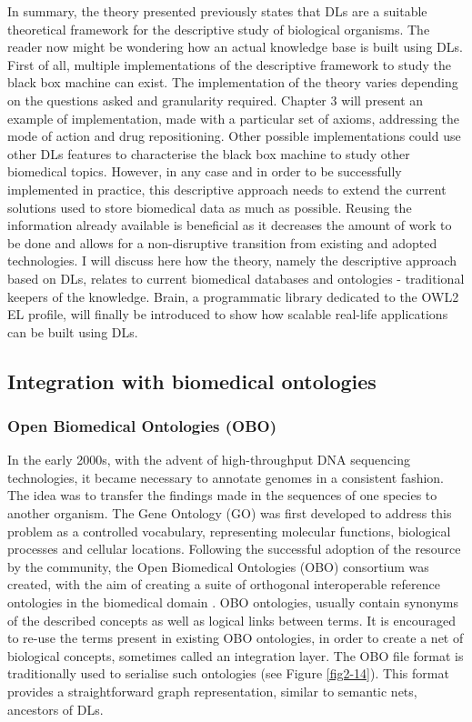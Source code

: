 In summary, the theory presented previously states that DLs are a suitable theoretical framework for the descriptive study of biological organisms. The reader now might be wondering how an actual knowledge base is built using DLs. First of all, multiple implementations of the descriptive framework to study the black box machine can exist. The implementation of the theory varies depending on the questions asked and granularity required. Chapter 3 will present an example of implementation, made with a particular set of axioms, addressing the mode of action and drug repositioning. Other possible implementations could use other DLs features to characterise the black box machine to study other biomedical topics. However, in any case and in order to be successfully implemented in practice, this descriptive approach needs to extend the current solutions used to store biomedical data as much as possible. Reusing the information already available is beneficial as it decreases the amount of work to be done and allows for a non-disruptive transition from existing and adopted technologies. I will discuss here how the theory, namely the descriptive approach based on DLs, relates to current biomedical databases and ontologies - traditional keepers of the knowledge. Brain, a programmatic library dedicated to the OWL2 EL profile, will finally be introduced to show how scalable real-life applications can be built using DLs.

\subsection{Integration with biomedical ontologies}

\subsubsection{Open Biomedical Ontologies (OBO)}

In the early 2000s, with the advent of high-throughput DNA sequencing technologies, it became necessary to annotate genomes in a consistent fashion. The idea was to transfer the findings made in the sequences of one species to another organism. The Gene Ontology (GO) was first developed to address this problem \citep{ashburner2000gene} as a controlled vocabulary, representing molecular functions, biological processes and cellular locations. Following the successful adoption of the resource by the community, the Open Biomedical Ontologies (OBO) consortium was created, with the aim of creating a suite of orthogonal interoperable reference ontologies in the biomedical domain \citep{obofoundry}. OBO ontologies, usually contain synonyms of the described concepts as well as logical links between terms. It is encouraged to re-use the terms present in existing OBO ontologies, in order to create a net of biological concepts, sometimes called an integration layer. The OBO file format is traditionally used to serialise such ontologies (see Figure \ref{fig2-14}). This format provides a straightforward graph representation, similar to semantic nets, ancestors of DLs.

